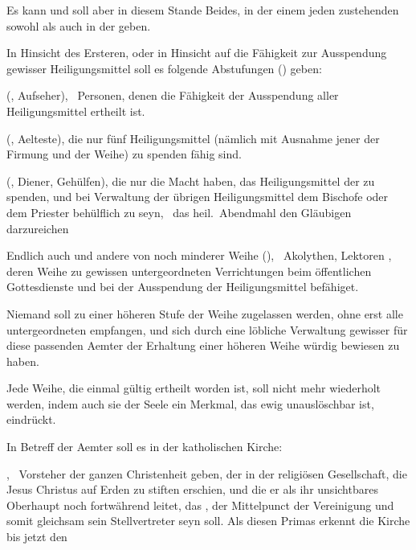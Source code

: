 \begin{aufza}
\item Es kann und soll aber in diesem Stande Beides,  in der einem jeden zustehenden  sowohl als auch in der  geben.
\item In Hinsicht des Ersteren, oder in Hinsicht auf die Fähigkeit zur Ausspendung gewisser Heiligungsmittel soll es folgende Abstufungen () geben:~
\begin{aufzb}
\item {} (, Aufseher), \dh\  Personen, denen die Fähigkeit der Ausspendung aller Heiligungsmittel ertheilt ist.
\item {} (, Aelteste), die nur fünf Heiligungsmittel (nämlich mit Ausnahme jener der Firmung und der Weihe) zu spenden fähig sind.
\item {} (, Diener, Gehülfen), die nur die Macht haben, das Heiligungsmittel der  zu spenden, und bei Verwaltung der übrigen Heiligungsmittel dem Bischofe oder dem Priester behülflich zu seyn, \zB\  das heil.\ Abendmahl den Gläubigen darzureichen \udgl\ 
\item Endlich auch  und andere von noch minderer Weihe (), \zB\  Akolythen, Lektoren \udgl , deren Weihe zu gewissen untergeordneten Verrichtungen beim öffentlichen Gottesdienste und bei der Ausspendung der Heiligungsmittel befähiget.
\end{aufzb}
\item Niemand soll zu einer höheren Stufe der Weihe zugelassen werden, ohne erst alle untergeordneten empfangen, und sich durch eine löbliche Verwaltung gewisser für diese passenden Aemter der Erhaltung einer höheren Weihe würdig bewiesen zu haben.
\item Jede Weihe, die einmal gültig ertheilt worden ist, soll nicht mehr wiederholt werden, indem auch sie der Seele ein Merkmal, das ewig unauslöschbar ist, eindrückt.
\item In Betreff der Aemter soll es in der katholischen Kirche:
\begin{aufzb}
\item {}, \di\ Vorsteher der ganzen Christenheit geben, der in der religiösen Gesellschaft, die Jesus Christus auf Erden zu stiften erschien, und die er als ihr unsichtbares Oberhaupt noch fortwährend leitet, das , der Mittelpunct der Vereinigung und somit gleichsam sein Stellvertreter seyn soll. Als diesen Primas erkennt die Kirche bis jetzt den 

\end{aufzb}
\end{aufza}

